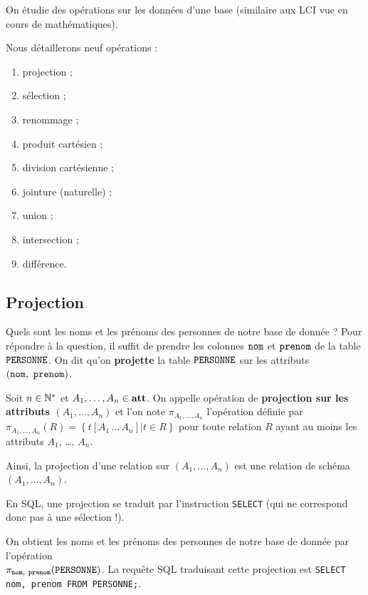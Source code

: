 On étudie des opérations sur les données d'une base (similaire aux LCI vue en cours de mathématiques).

Nous détaillerons neuf opérations :
\begin{multicols}{3}
\begin{enumerate}
\item projection ;
\item sélection ;
\item renommage ;
\item produit cartésien ;
\item division cartésienne ; 
\item jointure (naturelle) ;
\item union ;
\item intersection ;
\item différence.
\end{enumerate}
\end{multicols}
\subsection{Projection}

Quels sont les noms et les prénoms des personnes de notre base de donnée ? Pour répondre à la question, il suffit de prendre les colonnes
$\mathtt{nom}$ et $\mathtt{prenom}$ de la table $\mathtt{PERSONNE}{}$. On dit qu'on \textbf{projette} la
table $\mathtt{PERSONNE}$ sur les attributs $(\mathtt{nom},\ \mathtt{prenom})$.

\begin{defi}[Projection]
  Soit $n\in \mathbb{N}^{*}$ et $A_{1}, \ldots{}, A_{n}\in
  \mathbf{att}$. On appelle opération de \textbf{projection sur les attributs
    $(A_{1}, \ldots, A_{n})$}
  et l'on note $\pi_{A_{1},\ldots,A_{n}}$ l'opération définie par$
    \pi_{A_{1},\ldots,A_{n}}(R) = \left\{t[A_{1}\,\ldots\,A_{n}] | t \in R \right\}$
  pour toute relation $R$ ayant au moins les attributs $A_{1}$,
  \ldots{}, $A_{n}$.
  
  Ainsi, la projection d'une relation sur $(A_{1}, \ldots{}, A_{n})$ est une relation de schéma $(A_1,\dots,A_n)$.
\end{defi}

En SQL, une projection se traduit par l'instruction \texttt{SELECT} (qui ne correspond donc pas à une sélection !). 
\begin{exemple}
  On obtient les noms et les prénoms des personnes de notre base de donnée par l'opération  \\
  $\pi_{\mathtt{nom},\ \mathtt{prenom}}(\mathtt{PERSONNE})$.   La requête SQL traduisant cette projection est 
\texttt{SELECT nom, prenom FROM PERSONNE;}.

\end{exemple}
